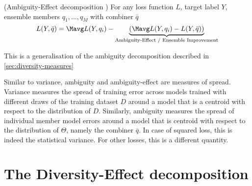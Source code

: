 \documentclass[../main.tex]{subfiles}
\begin{document}
\begin{theorem} \label{thm:ambig-effect-decomp} (Ambiguity-Effect decomposition \cite{todo}) For any loss function $L$, target label $Y$, ensemble members $q_{1}, \dots, q_{M}$ with combiner $\bar{q}$
$$
L(Y, \bar{q}) = \Mavg L(Y, q_{i}) -
\underbrace{\left(\Mavg L(Y, q_{i}) - L(Y, \bar{q})\right)}_{\text{Ambiguity-Effect / Ensemble Improvement}}
$$
\end{theorem}

This is a generalisation of the ambiguity decomposition described in \ref{sec:diversity-measures}


Similar to variance, ambiguity and ambiguity-effect are measures of spread. 
Variance measures the spread of training error across models trained with different draws of the training dataset $D$ around a model that is a centroid with respect to the distribution of $D$. Similarly, ambiguity measures the spread of individual member model errors around a model that is centroid with respect to the distribution of $\Theta$, namely the combiner $\bar{q}$. In case of squared loss, this is indeed the statistical variance. For other losses, this is a different quantity.



\section{The Diversity-Effect decomposition} \label{sec:bias-variance-diversity-decomp}
\end{document}
